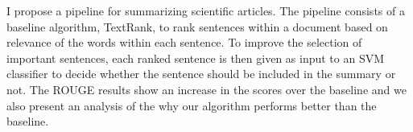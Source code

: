 I propose a pipeline for summarizing scientific articles.
The pipeline consists of a baseline algorithm, TextRank, to rank sentences within a document based on relevance of the words within each sentence.
To improve the selection of important sentences, each ranked sentence is then given as input to an SVM classifier to decide whether the sentence should be included in the summary or not.
The ROUGE results show an increase in the scores over the baseline and we also present an analysis of the why our algorithm performs better than the baseline.